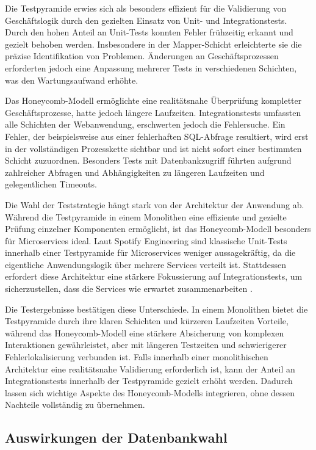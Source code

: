 Die Testpyramide erwies sich als besonders effizient für die Validierung von Geschäftslogik durch den gezielten Einsatz von Unit- und Integrationstests. Durch den hohen Anteil an Unit-Tests konnten Fehler frühzeitig erkannt und gezielt behoben werden. Insbesondere in der Mapper-Schicht erleichterte sie die präzise Identifikation von Problemen. Änderungen an Geschäftsprozessen erforderten jedoch eine Anpassung mehrerer Tests in verschiedenen Schichten, was den Wartungsaufwand erhöhte.

Das Honeycomb-Modell ermöglichte eine realitätsnahe Überprüfung kompletter Geschäftsprozesse, hatte jedoch längere Laufzeiten. Integrationstests umfassten alle Schichten der Webanwendung, erschwerten jedoch die Fehlersuche. Ein Fehler, der beispielsweise aus einer fehlerhaften SQL-Abfrage resultiert, wird erst in der vollständigen Prozesskette sichtbar und ist nicht sofort einer bestimmten Schicht zuzuordnen. Besonders Tests mit Datenbankzugriff führten aufgrund zahlreicher Abfragen und Abhängigkeiten zu längeren Laufzeiten und gelegentlichen Timeouts.

Die Wahl der Teststrategie hängt stark von der Architektur der Anwendung ab. Während die Testpyramide in einem Monolithen eine effiziente und gezielte Prüfung einzelner Komponenten ermöglicht, ist das Honeycomb-Modell besonders für Microservices ideal. Laut Spotify Engineering sind klassische Unit-Tests innerhalb einer Testpyramide für Microservices weniger aussagekräftig, da die eigentliche Anwendungslogik über mehrere Services verteilt ist. Stattdessen erfordert diese Architektur eine stärkere Fokussierung auf Integrationstests, um sicherzustellen, dass die Services wie erwartet zusammenarbeiten \cite{Spotify18}.

Die Testergebnisse bestätigen diese Unterschiede. In einem Monolithen bietet die Testpyramide durch ihre klaren Schichten und kürzeren Laufzeiten Vorteile, während das Honeycomb-Modell eine stärkere Absicherung von komplexen Interaktionen gewährleistet, aber mit längeren Testzeiten und schwierigerer Fehlerlokalisierung verbunden ist. Falls innerhalb einer monolithischen Architektur eine realitätsnahe Validierung erforderlich ist, kann der Anteil an Integrationstests innerhalb der Testpyramide gezielt erhöht werden. Dadurch lassen sich wichtige Aspekte des Honeycomb-Modells integrieren, ohne dessen Nachteile vollständig zu übernehmen.


\subsection{Auswirkungen der Datenbankwahl}

